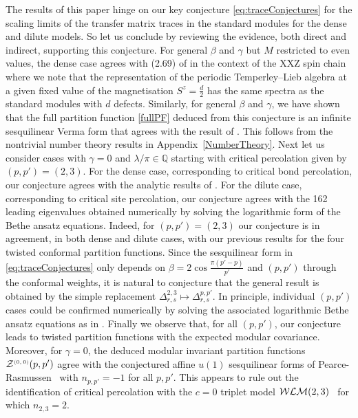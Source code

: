 \documentclass[11pt]{article}
\numberwithin{equation}{section}
\theoremstyle{definition}
\numberwithin{equation}{section}
\begin{document}
The results of this paper hinge on our key conjecture \eqref{eq:traceConjectures} for the scaling limits of the transfer matrix traces in the standard modules for the dense and dilute models. So let us conclude by reviewing the evidence, both direct and indirect, supporting this conjecture. 
For general $\beta$ and $\gamma$ but $M$ restricted to even values, the dense case agrees with (2.69) of \cite{PS90} in the context of the XXZ spin chain where we note that the representation of the periodic Temperley--Lieb algebra at a given fixed value of the magnetisation $S^z = \frac d2$ has the same spectra as the standard modules with $d$ defects. 
Similarly, for general $\beta$ and $\gamma$, we have shown that the full partition function \eqref{fullPF} deduced from this conjecture is an infinite sesquilinear Verma form that agrees with the result of \cite{FSZ87}. This follows from the nontrivial number theory results in Appendix~\ref{NumberTheory}. 
Next let us consider cases with $\gamma=0$ and $\lambda/\pi\in\mathbb{Q}$ starting with critical percolation given by $(p,p')=(2,3)$. 
For the dense case, corresponding to critical bond percolation, our conjecture agrees with the analytic results of \cite{MDKP17}. For the dilute case, corresponding to critical site percolation, 
our conjecture agrees with the 162 leading eigenvalues obtained numerically \cite{MDKP23} by solving the logarithmic form of the Bethe ansatz equations. 
Indeed, for $(p,p')=(2,3)$ our conjecture is in agreement, in both dense and dilute cases, with our previous results for the four twisted conformal partition functions.
Since the sesquilinear form in \eqref{eq:traceConjectures} only depends on $\beta = 2 \cos \frac {\pi(p'-p)}{p'}$
and $(p,p')$ through the conformal weights, it is natural to conjecture that the general result is obtained by the simple replacement $\Delta_{r,s}^{2,3}\mapsto\Delta_{r,s}^{p,p'}$.
In principle, individual $(p,p')$ cases could be confirmed numerically by solving the associated logarithmic Bethe ansatz equations as in \cite{MDKP23}.
Finally we observe that, for all $(p,p')$, our conjecture leads to twisted partition functions with the expected modular covariance. 
Moreover, for $\gamma=0$, the deduced modular invariant partition functions $\mathcal Z^{\textrm{\tiny$(0,0)$}}(p,p')$ agree with the conjectured affine $u(1)$ sesquilinear forms of Pearce-Rasmussen~\cite{PR2011} with  $n_{p,p'}=-1$ for all $p,p'$. This appears to rule out the identification of critical percolation with the $c=0$ triplet model ${\cal WLM}(2,3)$~\cite{GabRW2011} for which $n_{2,3}=2$.
\end{document}
